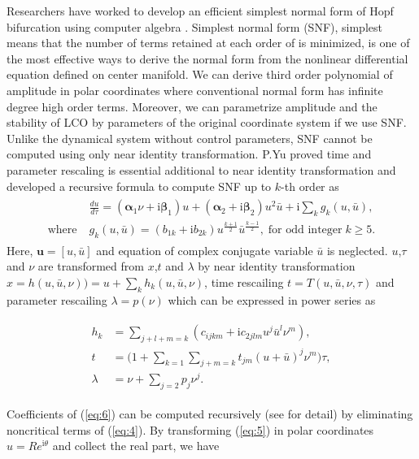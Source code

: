 \documentclass[openacc]{rsproca_new}%
\theoremstyle{own}
\def\vec#1{\ensuremath{\mathbf{#1}}}
\newcommand{\Eref}[1]{(\ref{#1})}
\begin{document}
Researchers have worked to develop an efficient simplest normal form of Hopf bifurcation using computer algebra \cite{yu1998computation}. Simplest normal form (SNF), simplest means that the number of terms retained at each order of is minimized, is one of the most effective ways to derive the normal form from the nonlinear differential equation defined on center manifold. We can derive third order polynomial of amplitude in polar coordinates where conventional normal form has infinite degree high order terms. Moreover, we can parametrize amplitude and the stability of LCO by parameters of the original coordinate system if we use SNF. Unlike the dynamical system without control parameters, SNF cannot be computed using only near identity transformation. P.Yu \cite{yu2002simplest} proved time and parameter rescaling is essential additional to near identity transformation and developed a recursive formula to compute SNF up to $k$-th order as
\begin{align}\label{eq:5}
  \begin{split}
    &\frac{du}{d\tau}=(\vec{\alpha}_1 \nu+\textrm{i}\vec{\beta}_1) u+(\vec{\alpha}_2+\textrm{i}\vec{\beta}_2) u^2 \bar{u}+\textrm{i}\sum_k g_k(u,\bar{u}),\\
    \textrm{where} \;  &g_k(u,\bar{u})=(b_{1k}+\textrm{i}b_{2k})u^{\frac{k+1}{2}}\bar{u}^{\frac{k-1}{2}}, \; \textrm{for odd integer} \;k \geq 5.
  \end{split}
\end{align}
Here, \(\vec{u}=[u,\bar{u}]\) and equation of complex conjugate variable \(\bar{u}\) is neglected. \(u\),\(\tau\) and \(\nu\) are transformed from \(x\),\(t\) and \(\lambda\) by near identity transformation
\(x=h(u,\bar{u},\nu))=u+\sum_k h_k(u,\bar{u},\nu)\), time rescailing \(t=T(u,\bar{u},\nu,\tau)\) and parameter rescailing \(\lambda=p(\nu)\) which can be expressed in power series as

\begin{align}\label{eq:6}
  \begin{split}
    h_k &=\sum_{j+l+m=k}(c_{ijkm}+\textrm{i}c_{2jlm}u^j\bar{u}^l \nu^m),\\
    t &=\Big(1+\sum_{k=1}\sum_{j+m=k}t_{jm}(u+\bar{u})^j\nu^m\Big)\tau,\\
    \lambda &=\nu+\sum_{j=2}p_j \nu^j.
  \end{split}
\end{align}

\noindent Coefficients of \Eref{eq:6} can be computed recursively (see \cite{yu2002simplest} for detail) by eliminating noncritical terms of \Eref{eq:4}. By transforming \Eref{eq:5} in polar coordinates $u=Re^{\textrm{i}\theta}$ and collect the real part, we have
\end{document}

